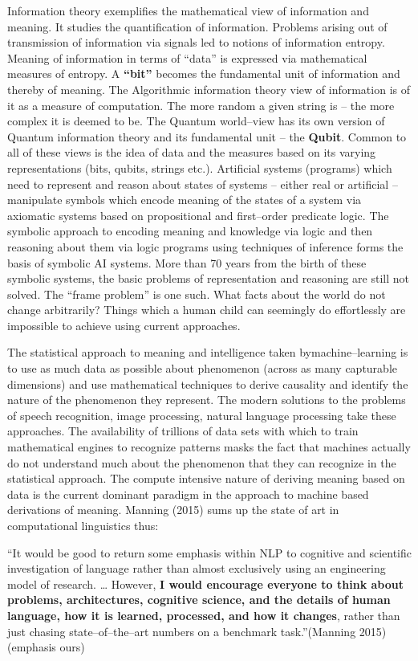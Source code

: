 Information theory exemplifies the mathematical view of information and meaning. It studies the quantification of information. Problems arising out of transmission of information via signals led to notions of information entropy. Meaning of information in terms of “data” is expressed via mathematical measures of entropy. A \textbf{“bit”} becomes the fundamental unit of information and thereby of meaning. The Algorithmic information theory view of information is of it as a measure of computation. The more random a given string is – the more complex it is deemed to be. The Quantum world–view has its own version of Quantum information theory and its fundamental unit – the \textbf{Qubit}. Common to all of these views is the idea of data and the measures based on its varying representations (bits, qubits, strings etc.). Artificial systems (programs) which need to represent and reason about states of systems – either real or artificial – manipulate symbols which encode meaning of the states of a system via axiomatic systems based on propositional and first–order predicate logic. The symbolic approach to encoding meaning and knowledge via logic and then reasoning about them via logic programs using techniques of inference forms the basis of symbolic AI systems. More than 70 years from the birth of these symbolic systems, the basic problems of representation and reasoning are still not solved. The “frame problem” is one such. What facts about the world do not change arbitrarily? Things which a human child can seemingly do effortlessly are impossible to achieve using current approaches.

The statistical approach to meaning and intelligence taken by\break machine–learning is to use as much data as possible about phenomenon (across as many capturable dimensions) and use mathematical techniques to derive causality and identify the nature of the phenomenon they represent. The modern solutions to the problems of speech recognition, image processing, natural language processing take these approaches. The availability of trillions of data sets with which to train mathematical engines to recognize patterns masks the fact that machines actually do not understand much about the phenomenon that they can recognize in the statistical approach. The compute intensive nature of deriving meaning based on data is the current dominant paradigm in the approach to machine based derivations of meaning. Manning (2015) sums up the state of art in computational linguistics thus:

\begin{myquote}
“It would be good to return some emphasis within NLP to cognitive and scientific investigation of language rather than almost exclusively using an engineering model of research. … However, \textbf{I would encourage everyone to think about problems, architectures, cognitive science, and the details of human language, how it is learned, processed, and how it changes}, rather than just chasing state–of–the–art numbers on a benchmark task.”\hfill (Manning 2015) (emphasis ours)
\end{myquote}

